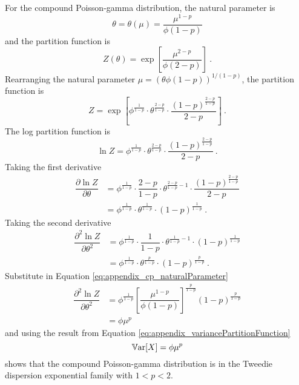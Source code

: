 For the compound Poisson-gamma distribution, the natural parameter is
\begin{equation}
  \theta = \theta(\mu) = \dfrac{\mu^{1-p}}{\phi(1-p)}
  \label{eq:appendix_cp_naturalParameter}
\end{equation}
and the partition function is
\begin{equation*}
  Z(\theta) = 
  \exp\left[
    \frac{\mu^{2-p}}{\phi(2-p)}
  \right]
  \ .
\end{equation*}
Rearranging the natural parameter $\mu=(\theta\phi(1-p))^{1/(1-p)}$, the partition function is
\begin{equation}
  Z = \exp\left[
    \phi^{\frac{1}{1-p}}
    \cdot
    \theta^{\frac{2-p}{1-p}}
    \cdot
    \dfrac{
      (1-p)^{\frac{2-p}{1-p}}
    }{
      2-p
    }
  \right]
  \ .
\end{equation}
The log partition function is
\begin{equation}
  \ln Z = \phi^{\frac{1}{1-p}}
    \cdot
    \theta^{\frac{2-p}{1-p}}
    \cdot
    \dfrac{
      (1-p)^{\frac{2-p}{1-p}}
    }{
      2-p
    }
  \ .
\end{equation}
Taking the first derivative
\begin{align}
  \dfrac{\partial \ln Z}{\partial \theta} &=
  \phi^{\frac{1}{1-p}}
  \cdot
  \dfrac{2-p}{1-p}\cdot\theta^{\frac{2-p}{1-p}-1}
  \cdot
  \dfrac{(1-p)^\frac{2-p}{1-p}}{2-p}
  \nonumber \\
  &= \phi^{\frac{1}{1-p}} \cdot \theta^{\frac{1}{1-p}} \cdot (1-p)^\frac{1}{1-p} \ .
\end{align}
Taking the second derivative
\begin{align}
  \dfrac{\partial^2 \ln Z}{\partial \theta^2} &=
  \phi^{\frac{1}{1-p}}
  \cdot
  \dfrac{1}{1-p}\cdot\theta^{\frac{1}{1-p}-1}
  \cdot
  (1-p)^\frac{1}{1-p}
  \nonumber \\
  &=
  \phi^{\frac{1}{1-p}}
  \cdot
  \theta^{\frac{p}{1-p}}
  \cdot
  (1-p)^\frac{p}{1-p} \ .
\end{align}
Substitute in Equation \eqref{eq:appendix_cp_naturalParameter}
\begin{align*}
  \dfrac{\partial^2 \ln Z}{\partial \theta^2} &=
  \phi^{\frac{1}{1-p}}
  \left[\dfrac{\mu^{1-p}}{\phi(1-p)}\right]^{\frac{p}{1-p}}
  (1-p)^\frac{p}{1-p}
  \nonumber \\
  & = \phi \mu^p
\end{align*}
and using the result from Equation \eqref{eq:appendix_variancePartitionFunction}
\begin{equation}
 \operatorname{\mathbb{V}ar}[X] = \phi \mu^p
\end{equation}
shows that the compound Poisson-gamma distribution is in the Tweedie dispersion exponential family with $1<p<2$.

